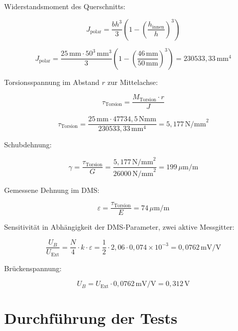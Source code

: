 Widerstandsmoment des Querschnitts:

\begin{equation}
J_{\text{polar}} = \frac{b h^3}{3} \left( 1 - \left( \frac{h_{\text{innen}}}{h} \right)^3 \right)
\end{equation}

\begin{equation}
J_{\text{polar}} = \frac{25\,\text{mm} \cdot 50^3\,\text{mm}^3}{3} \left( 1 - \left( \frac{46\,\text{mm}}{50\,\text{mm}} \right)^3 \right) = 230533,33\,\text{mm}^4
\end{equation}

Torsionsspannung im Abstand \( r \) zur Mittelachse:

\begin{equation}
\tau_{\text{Torsion}} = \frac{M_{\text{Torsion}} \cdot r}{J}
\end{equation}

\begin{equation}
\tau_{\text{Torsion}} = \frac{25\,\text{mm} \cdot 47734,5\,\text{Nmm}}{230533,33\,\text{mm}^4} = 5,177\,\text{N/mm}^2
\end{equation}

Schubdehnung:

\begin{equation}
\gamma = \frac{\tau_{\text{Torsion}}}{G} = \frac{5,177\,\text{N/mm}^2}{26000\,\text{N/mm}^2} = 199\,\mu\text{m/m}
\end{equation}

Gemessene Dehnung im DMS:

\begin{equation}
\varepsilon = \frac{\tau_{\text{Torsion}}}{E} = 74\,\mu\text{m/m}
\end{equation}

Sensitivität in Abhängigkeit der DMS-Parameter, zwei aktive Messgitter:

\begin{equation}
\frac{U_B}{U_{\text{Ext}}} = \frac{N}{4} \cdot k \cdot \varepsilon = \frac{1}{2} \cdot 2,06 \cdot 0,074 \times 10^{-3} = 0,0762\,\text{mV/V}
\end{equation}

Brückenspannung:

\begin{equation}
U_B = U_{\text{Ext}} \cdot 0,0762\,\text{mV/V} = 0,312\,\text{V}
\end{equation}



\section{Durchführung der Tests}
